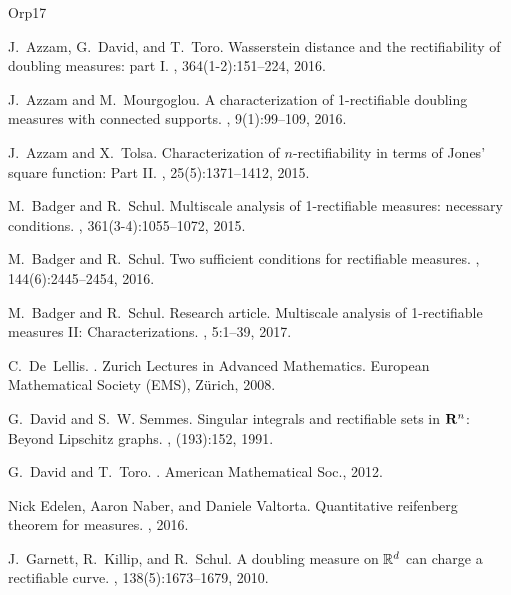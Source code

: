 \documentclass[11pt]{amsart}
\theoremstyle{definition}
\theoremstyle{remark}
\numberwithin{equation}{section}
\begin{document}
\def\cprime{$'$}
\begin{thebibliography}{{Orp}17}

J.~Azzam, G.~David, and T.~Toro.
\newblock Wasserstein distance and the rectifiability of doubling measures:
  part {I}.
, 364(1-2):151--224, 2016.

J.~Azzam and M.~Mourgoglou.
\newblock A characterization of 1-rectifiable doubling measures with connected
  supports.
, 9(1):99--109, 2016.

J.~Azzam and X.~Tolsa.
\newblock Characterization of {$n$}-rectifiability in terms of {J}ones' square
  function: {P}art {II}.
, 25(5):1371--1412, 2015.

M.~Badger and R.~Schul.
\newblock Multiscale analysis of 1-rectifiable measures: necessary conditions.
, 361(3-4):1055--1072, 2015.

M.~Badger and R.~Schul.
\newblock Two sufficient conditions for rectifiable measures.
, 144(6):2445--2454, 2016.

M.~Badger and R.~Schul.
\newblock Research article. {M}ultiscale analysis of 1-rectifiable measures
  {II}: {C}haracterizations.
, 5:1--39, 2017.

C.~De~Lellis.
.
\newblock Zurich Lectures in Advanced Mathematics. European Mathematical
  Society (EMS), Z\"urich, 2008.

G.~David and S.~W. Semmes.
\newblock Singular integrals and rectifiable sets in {${\bf R}^n$}: {B}eyond
  {L}ipschitz graphs.
, (193):152, 1991.

G.~David and T.~Toro.
.
\newblock American Mathematical Soc., 2012.

Nick Edelen, Aaron Naber, and Daniele Valtorta.
\newblock Quantitative reifenberg theorem for measures.
, 2016.

J.~Garnett, R.~Killip, and R.~Schul.
\newblock A doubling measure on {$\Bbb R^d$} can charge a rectifiable curve.
, 138(5):1673--1679, 2010.


\end{thebibliography}
\end{document}
